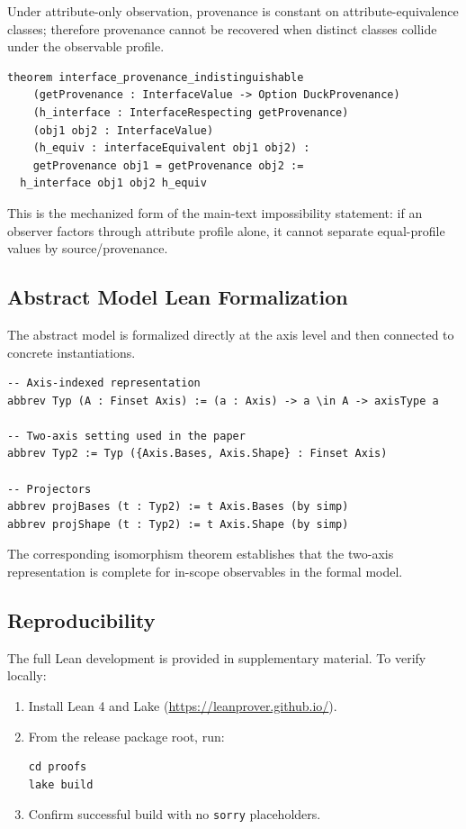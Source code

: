 Under attribute-only observation, provenance is constant on attribute-equivalence classes; therefore provenance cannot be recovered when distinct classes collide under the observable profile.

\begin{lstlisting}[style=lean]
theorem interface_provenance_indistinguishable
    (getProvenance : InterfaceValue -> Option DuckProvenance)
    (h_interface : InterfaceRespecting getProvenance)
    (obj1 obj2 : InterfaceValue)
    (h_equiv : interfaceEquivalent obj1 obj2) :
    getProvenance obj1 = getProvenance obj2 :=
  h_interface obj1 obj2 h_equiv
\end{lstlisting}

This is the mechanized form of the main-text impossibility statement: if an observer factors through attribute profile alone, it cannot separate equal-profile values by source/provenance.

\subsection{Abstract Model Lean Formalization}\label{abstract-model-lean-formalization}

The abstract model is formalized directly at the axis level and then connected to concrete instantiations.

\begin{lstlisting}[style=lean]
-- Axis-indexed representation
abbrev Typ (A : Finset Axis) := (a : Axis) -> a \in A -> axisType a

-- Two-axis setting used in the paper
abbrev Typ2 := Typ ({Axis.Bases, Axis.Shape} : Finset Axis)

-- Projectors
abbrev projBases (t : Typ2) := t Axis.Bases (by simp)
abbrev projShape (t : Typ2) := t Axis.Shape (by simp)
\end{lstlisting}

The corresponding isomorphism theorem establishes that the two-axis representation is complete for in-scope observables in the formal model.

\subsection{Reproducibility}

The full Lean development is provided in supplementary material. To verify locally:
\begin{enumerate}
\item Install Lean 4 and Lake (\url{https://leanprover.github.io/}).
\item From the release package root, run:
\begin{lstlisting}[style=lean]
cd proofs
lake build
\end{lstlisting}
\item Confirm successful build with no \texttt{sorry} placeholders.
\end{enumerate}

